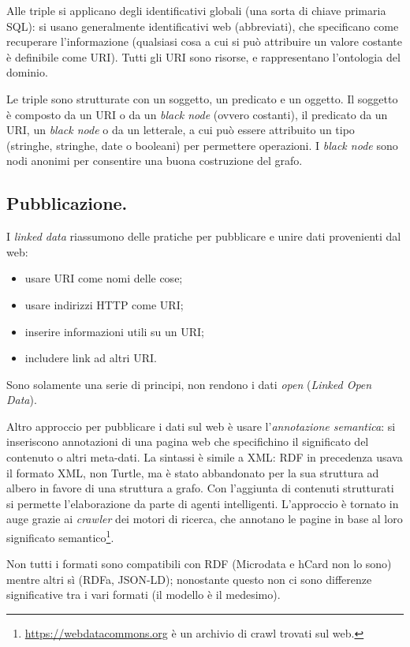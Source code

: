 \documentclass[11pt, twocolumn]{article}
\begin{document}
Alle triple si applicano degli identificativi globali (una sorta di chiave primaria SQL): si usano generalmente identificativi web (abbreviati), che specificano come recuperare l'informazione (qualsiasi cosa a cui si può attribuire un valore costante è definibile come URI).
Tutti gli URI sono risorse, e rappresentano l'ontologia del dominio.

Le triple sono strutturate con un soggetto, un predicato e un oggetto.
Il soggetto è composto da un URI o da un \textit{black node} (ovvero costanti), il predicato da un URI, un \textit{black node} o da un letterale, a cui può essere attribuito un tipo (stringhe, stringhe, date o booleani) per permettere operazioni.
I \textit{black node} sono nodi anonimi per consentire una buona costruzione del grafo.

\subsection{Pubblicazione.}
I \textit{linked data} riassumono delle pratiche per pubblicare e unire dati provenienti dal web:
\begin{itemize}
  \item usare URI come nomi delle cose;
  \item usare indirizzi HTTP come URI;
  \item inserire informazioni utili su un URI;
  \item includere link ad altri URI.
\end{itemize}
Sono solamente una serie di principi, non rendono i dati \textit{open} (\textit{Linked Open Data}). \newline

Altro approccio per pubblicare i dati sul web è usare l'\textit{annotazione semantica}: si inseriscono annotazioni di una pagina web che specifichino il significato del contenuto o altri meta-dati.
La sintassi è simile a XML: RDF in precedenza usava il formato XML, non Turtle, ma è stato abbandonato per la sua struttura ad albero in favore di una struttura a grafo.
Con l'aggiunta di contenuti strutturati si permette l'elaborazione da parte di agenti intelligenti.
L'approccio è tornato in auge grazie ai \textit{crawler} dei motori di ricerca, che annotano le pagine in base al loro significato semantico\footnote{\url{https://webdatacommons.org} è un archivio di crawl trovati sul web.}.

Non tutti i formati sono compatibili con RDF (Microdata e hCard non lo sono) mentre altri sì (RDFa, JSON-LD); nonostante questo non ci sono differenze significative tra i vari formati (il modello è il medesimo).
\end{document}
